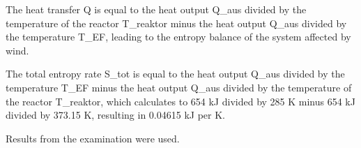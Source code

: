 The heat transfer Q is equal to the heat output Q_aus divided by the temperature of the reactor T_reaktor minus the heat output Q_aus divided by the temperature T_EF, leading to the entropy balance of the system affected by wind.

The total entropy rate S_tot is equal to the heat output Q_aus divided by the temperature T_EF minus the heat output Q_aus divided by the temperature of the reactor T_reaktor, which calculates to 654 kJ divided by 285 K minus 654 kJ divided by 373.15 K, resulting in 0.04615 kJ per K.

Results from the examination were used.